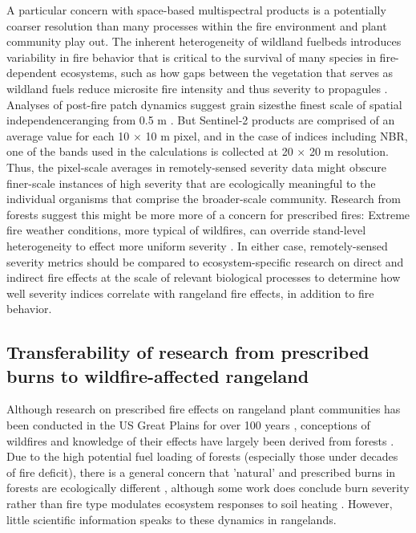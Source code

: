 \documentclass[fire,article,submit,oneauthor,pdftex]{Definitions/mdpi}
\begin{document}
A particular concern with space-based multispectral products is a potentially coarser resolution than many processes within the fire environment and plant community play out. 
The inherent heterogeneity of wildland fuelbeds introduces variability in fire behavior that is critical to the survival of many species in fire-dependent ecosystems, such as how gaps between the vegetation that serves as wildland fuels reduce microsite fire intensity and thus severity to propagules \cite{daibes2018, atchley2021}. 
Analyses of post-fire patch dynamics suggest grain sizes\textemdash the finest scale of spatial independence\textemdash ranging from 0.5 m \cite{lamont1993, gimeno-garcia2004, pereira2013, gongalsky2016, moore2021}. 
But Sentinel-2 products are comprised of an average value for each 10 $\times$ 10 m pixel, and in the case of indices including NBR, one of the bands used in the calculations is collected at 20 $\times$ 20 m resolution. 
Thus, the pixel-scale averages in remotely-sensed severity data might obscure finer-scale instances of high severity that are ecologically meaningful to the individual organisms that comprise the broader-scale community. 
Research from forests suggest this might be more more of a concern for prescribed fires: Extreme fire weather conditions, more typical of wildfires, can override stand-level heterogeneity to effect more uniform severity \cite{romme2006, mcfarland2025}. 
In either case, remotely-sensed severity metrics should be compared to ecosystem-specific research on direct and indirect fire effects at the scale of relevant biological processes to determine how well severity indices correlate with rangeland fire effects, in addition to fire behavior. 

\subsection{Transferability of research from prescribed burns to wildfire-affected rangeland}

Although research on prescribed fire effects on rangeland plant communities has been conducted in the US Great Plains for over 100 years \cite{hensel1923, aldous1934, hulbert1969}, conceptions of wildfires and knowledge of their effects have largely been derived from forests \cite{crist2023}.
Due to the high potential fuel loading of forests (especially those under decades of fire deficit), there is a general concern that 'natural' and prescribed burns in forests are ecologically different \cite{williams1994}, although some work does conclude burn severity rather than fire type modulates ecosystem responses to soil heating \cite{souza-alonso2024}.
However, little scientific information speaks to these dynamics in rangelands. 
\end{document}
